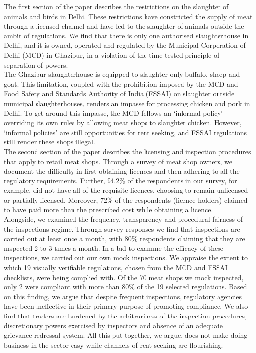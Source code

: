 \documentclass[a4paper, 12pt]{article}
\begin{document}
The first section of the paper describes the restrictions on the slaughter of animals and birds in Delhi. These restrictions have constricted the supply of meat through a licensed channel and have led to the slaughter of animals outside the ambit of regulations. We find that there is only one authorised slaughterhouse in Delhi, and it is owned, operated and regulated by the Municipal Corporation of Delhi (MCD) in Ghazipur, in a violation of the time-tested principle of separation of powers. \\

The Ghazipur slaughterhouse is equipped to slaughter only buffalo, sheep and goat. This limitation, coupled with the prohibition imposed by the MCD and Food Safety and Standards Authority of India (FSSAI) on slaughter outside municipal slaughterhouses, renders an impasse for processing chicken and pork in Delhi. To get around this impasse, the MCD follows an ‘informal policy’ overriding its own rules by allowing meat shops to slaughter chicken. However, ‘informal policies’ are still opportunities for rent seeking, and FSSAI regulations still render these shops illegal. \\

The second section of the paper describes the licensing and inspection procedures that apply to retail meat shops. Through a survey of meat shop owners, we document the difficulty in first obtaining licences and then adhering to all the regulatory requirements. Further, 94.2\% of the respondents in our survey, for example, did not have all of the requisite licences, choosing to remain unlicensed or partially licensed. Moreover, 72\% of the respondents (licence holders) claimed to have paid more than the prescribed cost while obtaining a licence. \\

Alongside, we examined the frequency, transparency and procedural fairness of the inspections regime. Through survey responses we find that inspections are carried out at least once a month, with 80\% respondents claiming that they are inspected 2 to 3 times a month. In a bid to examine the efficacy of these inspections, we carried out our own mock inspections. We appraise the extent to which 19 visually verifiable regulations, chosen from the MCD and FSSAI checklists, were being complied with. Of the 70 meat shops we mock inspected, only 2 were compliant with more than 80\% of the 19 selected regulations. Based on this finding, we argue that despite frequent inspections, regulatory agencies have been ineffective in their primary purpose of promoting compliance. We also find that traders are burdened by the arbitrariness of the inspection procedures, discretionary powers exercised by inspectors and absence of an adequate grievance redressal system. All this put together, we argue, does not make doing business in the sector easy while channels of rent seeking are flourishing. 
\end{document}
